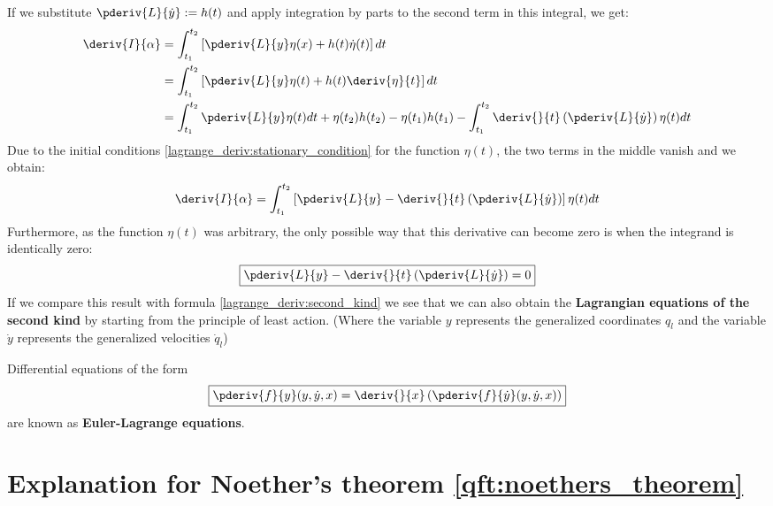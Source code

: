     If we substitute $\pderiv{L}{\dot{y}} := h(t)$ and apply integration by parts to the second term in this integral, we get:
    \begin{align}
        \deriv{I}{\alpha}&=\int_{t_1}^{t_2}\left[\pderiv{L}{y}\eta(x) + h(t)\dot{\eta}(t)\right]dt\nonumber\\
        &=\int_{t_1}^{t_2}\left[\pderiv{L}{y}\eta(t) + h(t)\deriv{\eta}{t}\right]dt\nonumber\\
        &=\int_{t_1}^{t_2}\pderiv{L}{y}\eta(t)dt + \eta(t_2)h(t_2) - \eta(t_1)h(t_1) - \int_{t_1}^{t_2}\deriv{}{t}\left(\pderiv{L}{\dot{y}}\right)\eta(t)dt
	\end{align}
    Due to the initial conditions \ref{lagrange_deriv:stationary_condition} for the function $\eta(t)$, the two terms in the middle vanish and we obtain:
    \begin{equation}
		\label{lagrange_deriv:final_integral}
        \deriv{I}{\alpha}=\int_{t_1}^{t_2}\left[\pderiv{L}{y} - \deriv{}{t}\left(\pderiv{L}{\dot{y}}\right)\right]\eta(t)dt
	\end{equation}
    Furthermore, as the function $\eta(t)$ was arbitrary, the only possible way that this derivative can become zero is when the integrand is identically zero:
    \begin{equation}
		\label{lagrange_deriv:second_kind_with_hamilton}
        \boxed{\pderiv{L}{y} - \deriv{}{t}\left(\pderiv{L}{\dot{y}}\right) = 0}
	\end{equation}
    If we compare this result with formula \ref{lagrange_deriv:second_kind} we see that we can also obtain the \textbf{Lagrangian equations of the second kind} by starting from the principle of least action. (Where the variable $y$ represents the generalized coordinates $q_l$ and the variable $\dot{y}$ represents the generalized velocities $\dot{q}_l$)
    
    \begin{remark}
		Differential equations of the form
        \begin{equation}
			\label{lagrange_deriv:euler_lagrange_equation}
            \boxed{\pderiv{f}{y}(y, \dot{y}, x) = \deriv{}{x}\left(\pderiv{f}{\dot{y}}(y, \dot{y}, x)\right)}
		\end{equation}
        are known as \textbf{Euler-Lagrange equations}.
	\end{remark}

\section{Explanation for Noether's theorem \ref{qft:noethers_theorem}}\label{proof:noether}

